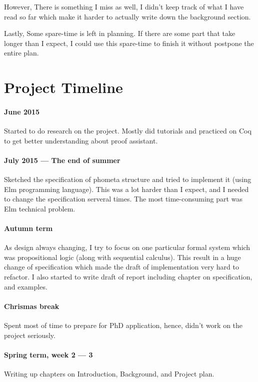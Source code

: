 However, There is something I miss as well, I didn't keep track of what I have read so far which make it harder to actually write down the background section.

Lastly, Some spare-time is left in planning. If there are some part that take longer than I expect, I could use this spare-time to finish it without postpone the entire plan.

\section{Project Timeline}

\paragraph{June 2015} Started to do research on the project. Mostly did tutorials and practiced on Coq to get better understanding about proof assistant.

\paragraph{July 2015 --- The end of summer} Sketched the specification of phometa structure and tried to implement it (using Elm programming language).
This was a lot harder than I expect, and I needed to change the specification serveral times. The most time-consuming part was Elm technical problem.

\paragraph{Autumn term} As design always changing, I try to focus on one particular formal system which was propositional logic (along with sequential calculus). This result in a huge change of specification which made the draft of implementation very hard to refactor. I also started to write draft of report including chapter on specification, and examples.

\paragraph{Chrismas break} Spent most of time to prepare for PhD application, hence, didn't work on the project seriously.

\paragraph{Spring term, week 2 --- 3} Writing up chapters on Introduction, Background, and Project plan.

